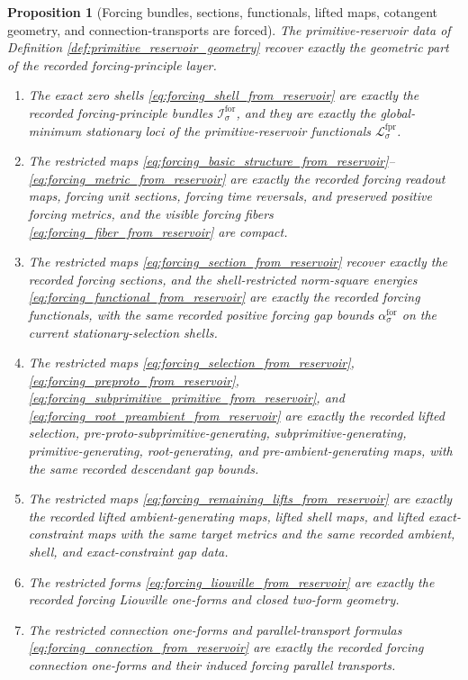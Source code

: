 \documentclass[11pt]{article}
\newcommand{\ForSpace}[1]{\mathcal I_{#1}^{\mathrm{for}}}
\newcommand{\ForGap}[1]{\alpha_{#1}^{\mathrm{for}}}
\newcommand{\ForPrimFunctional}[1]{\mathscr L_{#1}^{\mathrm{fpr}}}
\newtheorem{proposition}{Proposition}
\begin{document}
\begin{proposition}[Forcing bundles, sections, functionals, lifted maps, cotangent geometry, and connection-transports are forced]
\label{prop:forcing_geometry_forced}
The primitive-reservoir data of Definition \ref{def:primitive_reservoir_geometry} recover exactly the geometric part of the recorded forcing-principle layer.
\begin{enumerate}
    \item The exact zero shells \eqref{eq:forcing_shell_from_reservoir} are exactly the recorded forcing-principle bundles \(\ForSpace{\sigma}\), and they are exactly the global-minimum stationary loci of the primitive-reservoir functionals \(\ForPrimFunctional{\sigma}\).
    \item The restricted maps \eqref{eq:forcing_basic_structure_from_reservoir}--\eqref{eq:forcing_metric_from_reservoir} are exactly the recorded forcing readout maps, forcing unit sections, forcing time reversals, and preserved positive forcing metrics, and the visible forcing fibers \eqref{eq:forcing_fiber_from_reservoir} are compact.
    \item The restricted maps \eqref{eq:forcing_section_from_reservoir} recover exactly the recorded forcing sections, and the shell-restricted norm-square energies \eqref{eq:forcing_functional_from_reservoir} are exactly the recorded forcing functionals, with the same recorded positive forcing gap bounds \(\ForGap{\sigma}\) on the current stationary-selection shells.
    \item The restricted maps \eqref{eq:forcing_selection_from_reservoir}, \eqref{eq:forcing_preproto_from_reservoir}, \eqref{eq:forcing_subprimitive_primitive_from_reservoir}, and \eqref{eq:forcing_root_preambient_from_reservoir} are exactly the recorded lifted selection, pre-proto-subprimitive-generating, subprimitive-generating, primitive-generating, root-generating, and pre-ambient-generating maps, with the same recorded descendant gap bounds.
    \item The restricted maps \eqref{eq:forcing_remaining_lifts_from_reservoir} are exactly the recorded lifted ambient-generating maps, lifted shell maps, and lifted exact-constraint maps with the same target metrics and the same recorded ambient, shell, and exact-constraint gap data.
    \item The restricted forms \eqref{eq:forcing_liouville_from_reservoir} are exactly the recorded forcing Liouville one-forms and closed two-form geometry.
    \item The restricted connection one-forms and parallel-transport formulas \eqref{eq:forcing_connection_from_reservoir} are exactly the recorded forcing connection one-forms and their induced forcing parallel transports.

\end{enumerate}
\end{proposition}
\end{document}
